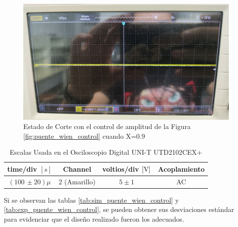             
            \begin{figure}[H]
                \centering
                \renewcommand{\figurename}{Imagen}
                \includegraphics[width=15cm]{Imagenes/exp_puente_wien_control9.jpg}
                \caption{Estado de Corte con el control de amplitud de la Figura \ref{fig:puente_wien_control} cuando X=0.9}
                \label{fig:exp_puente_wien_control9}
            \end{figure}

            \begin{table}[H]
                \centering
                \begin{tabular}{|c|c|c|c|}
                    \hline
                    \textbf{time/div} $[s]$ & \textbf{Channel} & \textbf{voltios/div $[\volt]$} & \textbf{Acoplamiento} \\ \hline
                    $(100 \, \pm 20) \mu  $ & 2 (Amarillo)  &   $5 \pm 1 $ & AC \\ \hline  
                \end{tabular}
                \caption{Escalas Usada en el Osciloscopio Digital UNI-T UTD2102CEX+}
                \label{tab:escala_puente_wien_control9}
            \end{table}

             Si se observan las tablas \ref{tab:sim_puente_wien_control} y \ref{tab:exp_puente_wien_control}, se pueden obtener sus desviaciones estándar para evidenciar que el diseño realizado fueron los adecuados.
             
